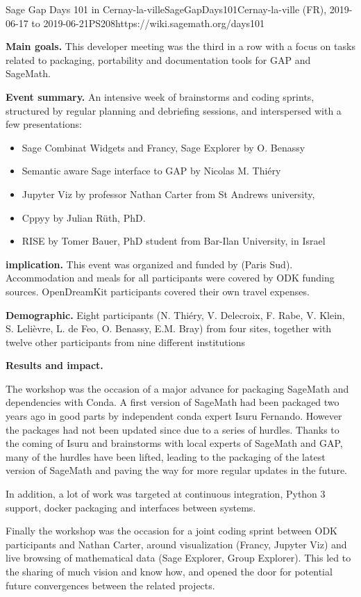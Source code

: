 \begin{event}{Sage Gap Days 101 in Cernay-la-ville}{SageGapDays101}{Cernay-la-ville (FR), 2019-06-17 to 2019-06-21}{PS}{20}{8}{https://wiki.sagemath.org/days101}

\textbf{Main goals.} This developer meeting was the third in a row
with a focus on \ODK tasks related to packaging, portability and
documentation tools for GAP and SageMath.


\textbf{Event summary.} An intensive week of brainstorms and coding
sprints, structured by regular planning and debriefing sessions, and
interspersed with a few presentations:
\begin{itemize}
\item Sage Combinat Widgets and Francy, Sage Explorer by O. Benassy
\item Semantic aware Sage interface to GAP by Nicolas M. Thiéry
\item Jupyter Viz by professor Nathan Carter from St Andrews
  university,
\item Cppyy by Julian Rüth, PhD.
\item RISE by Tomer Bauer, PhD student from Bar-Ilan University, in
  Israel
\end{itemize}

\textbf{\ODK implication.} This event was organized and funded by \ODK
(Paris Sud). Accommodation and meals for all participants were covered
by ODK funding sources. OpenDreamKit participants covered their own
travel expenses.

\textbf{Demographic.} Eight \ODK participants (N. Thiéry, V.
Delecroix, F. Rabe, V. Klein, S. Lelièvre, L. de Feo, O. Benassy, E.M.
Bray) from four sites, together with twelve other participants from
nine different institutions


\textbf{Results and impact.}

The workshop was the occasion of a major advance for packaging
SageMath and dependencies with Conda. A first version of SageMath had
been packaged two years ago in good parts by independent conda expert
Isuru Fernando. However the packages had not been updated since due to
a series of hurdles. Thanks to the coming of Isuru and brainstorms
with local experts of SageMath and GAP, many of the hurdles have been
lifted, leading to the packaging of the latest version of SageMath and
paving the way for more regular updates in the future.

In addition, a lot of work was targeted at continuous integration,
Python 3 support, docker packaging and interfaces between systems.

Finally the workshop was the occasion for a joint coding sprint
between ODK participants and Nathan Carter, around visualization
(Francy, Jupyter Viz) and live browsing of mathematical data (Sage
Explorer, Group Explorer). This led to the sharing of much vision and
know how, and opened the door for potential future convergences
between the related projects.

\end{event}
